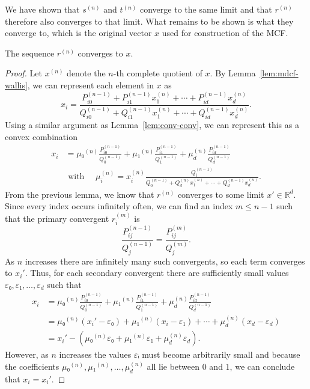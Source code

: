 We have shown that $s^{(n)}$ and $t^{(n)}$ converge to the same limit
and that $r^{(n)}$ therefore also converges to that limit.
What remains to be shown is what they converge to,
which is the original vector $x$ used for construction of the MCF.

\begin{theorem}
  \label{thm:mdcf-conv}
  The sequence $r^{(n)}$ converges to $x$.
\end{theorem}

\begin{proof}
  Let $x^{(n)}$ denote the $n$-th complete quotient of $x$.
  By Lemma~\ref{lem:mdcf-wallis}, we can represent each element in $x$ as
  \[
    x_i = \frac{P_{i0}^{(n-1)} + P_{i1}^{(n-1)} x_1^{(n)} + ⋯ + P_{id}^{(n-1)} x_d^{(n)}}{Q_{i0}^{(n-1)} + Q_{i1}^{(n-1)} x_1^{(n)} + ⋯ + Q_{id}^{(n-1)} x_d^{(n)}}.
  \]
  Using a similar argument as Lemma~\ref{lem:conv-conv}, we can represent this
  as a convex combination
  \begin{align*}
    x_i & = μ₀^{(n)} \frac{P_{i0}^{(n-1)}}{Q_0^{(n-1)}}  + μ₁^{(n)} \frac{P_{i1}^{(n-1)}}{Q_1^{(n-1)}} + μ_d^{(n)} \frac{P_{id}^{(n-1)}}{Q_d^{(n-1)}}
    \\
    &
    \text{ with }
    \quad
    μ_i^{(n)} = x_i^{(n)} \frac{Q_i^{(n-1)}}{Q_0^{(n-1)} + Q_d^{(n)} x_1^{(n)} + ⋯ + Q_d^{(n-1)} x_d^{(n)}}.
  \end{align*}
  From the previous lemma, we know that $r^{(n)}$ converges to some limit $x' ∈ ℝ^d$.
  Since every index occurs infinitely often,
  we can find an index $m ≤ n - 1$ such that the primary convergent $r_i^{(m)}$ is
  \[
    \frac{P_{ij}^{(n-1)}}{Q_j^{(n-1)}} = \frac{P_{ij}^{(m)}}{Q_j^{(m)}}.
  \]
  As $n$ increases there are infinitely many such convergents, so each term converges to $x_i'$.
  Thus, for each secondary convergent there are sufficiently small values $ε₀, ε₁, …, ε_d$ such that
  \begin{align*}
    x_i
    & = μ₀^{(n)} \frac{P_{i0}^{(n-1)}}{Q_0^{(n-1)}}  + μ₁^{(n)} \frac{P_{i1}^{(n-1)}}{Q_1^{(n-1)}} + μ_d^{(n)} \frac{P_{id}^{(n-1)}}{Q_d^{(n-1)}} \\
    & = μ₀^{(n)} (x_i' - ε₀) + μ₁^{(n)} (x_i - ε₁) + ⋯ + μ_d^{(n)} (x_d - ε_d) \\
    & = x_i' - (μ₀^{(n)} ε₀ + μ₁^{(n)} ε₁ + μ_d^{(n)} ε_d).
  \end{align*}
  However, as $n$ increases the values $εᵢ$ must become arbitrarily small
  and because the coefficients $μ₀^{(n)}, μ₁^{(n)}, …, μ_d^{(n)}$ all lie between $0$ and $1$,
  we can conclude that $x_i = x_i'$.
\end{proof}

